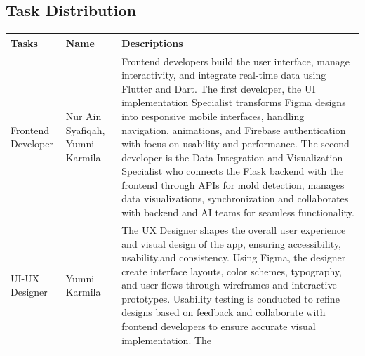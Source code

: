 \documentclass[conference]{IEEEtran}
\begin{document}
\subsection{Task Distribution}

\begin{table}[h]
\centering
\setlength{\tabcolsep}{12pt}
\renewcommand{\arraystretch}{1.5}
\begin{tabular}{|p{1cm}|p{1.5cm}|p{4cm}|}
\hline Tasks & Name & Descriptions\\ \hline
Frontend Developer & Nur Ain Syafiqah, Yumni Karmila & Frontend developers build the user interface, manage interactivity, and integrate real-time data using Flutter and Dart. The first developer, the UI implementation Specialist transforms Figma designs into responsive mobile interfaces, handling navigation, animations, and Firebase authentication with focus on usability and performance. The second developer is the Data Integration and Visualization Specialist who connects the Flask backend with the frontend through APIs for mold detection, manages data visualizations, synchronization and collaborates with backend and AI teams for seamless functionality.\\
\hline
UI-UX Designer & Yumni Karmila & The UX Designer shapes the overall user experience and visual design of the app, ensuring accessibility, usability,and consistency. Using Figma, the designer create interface layouts, color schemes, typography, and user flows through wireframes and interactive prototypes. Usability testing is conducted to refine designs based on feedback and collaborate with frontend developers to ensure accurate visual implementation. The \\
\hline
\end{tabular}
\end{table}
\end{document}
